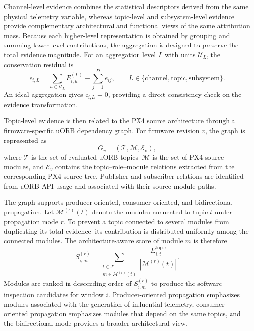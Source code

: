 Channel-level evidence combines the statistical descriptors derived from the same physical telemetry variable, whereas topic-level and subsystem-level evidence provide complementary architectural and functional views of the same attribution mass. Because each higher-level representation is obtained by grouping and summing lower-level contributions, the aggregation is designed to preserve the total evidence magnitude. For an aggregation level $L$ with units $\mathcal{U}_L$, the conservation residual is
\begin{equation}
\epsilon_{i,L}
=
\sum_{u\in\mathcal{U}_L}E^{(L)}_{i,u}
-
\sum_{j=1}^{D}e_{ij},
\qquad
L\in\{\mathrm{channel},\mathrm{topic},\mathrm{subsystem}\}.
\label{eq:evidence_conservation_error}
\end{equation}
An ideal aggregation gives $\epsilon_{i,L}=0$, providing a direct consistency check on the evidence transformation.

Topic-level evidence is then related to the PX4 source architecture through a firmware-specific uORB dependency graph. For firmware revision $v$, the graph is represented as
\begin{equation}
G_v=(\mathcal{T},\mathcal{M},\mathcal{E}_v),
\label{eq:px4_architecture_graph}
\end{equation}
where $\mathcal{T}$ is the set of evaluated uORB topics, $\mathcal{M}$ is the set of PX4 source modules, and $\mathcal{E}_v$ contains the topic--role--module relations extracted from the corresponding PX4 source tree. Publisher and subscriber relations are identified from uORB API usage and associated with their source-module paths.

The graph supports producer-oriented, consumer-oriented, and bidirectional propagation. Let $\mathcal{M}^{(r)}(t)$ denote the modules connected to topic $t$ under propagation mode $r$. To prevent a topic connected to several modules from duplicating its total evidence, its contribution is distributed uniformly among the connected modules. The architecture-aware score of module $m$ is therefore
\begin{equation}
S^{(r)}_{i,m}
=
\sum_{\substack{t\in\mathcal{T}\\m\in\mathcal{M}^{(r)}(t)}}
\frac{E^{\mathrm{topic}}_{i,t}}
{|\mathcal{M}^{(r)}(t)|}.
\label{eq:module_evidence_score}
\end{equation}
Modules are ranked in descending order of $S^{(r)}_{i,m}$ to produce the software inspection candidates for window $i$. Producer-oriented propagation emphasizes modules associated with the generation of influential telemetry, consumer-oriented propagation emphasizes modules that depend on the same topics, and the bidirectional mode provides a broader architectural view.

